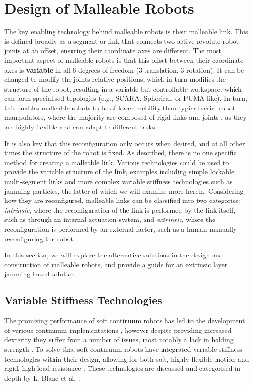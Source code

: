 
\section{Design of Malleable Robots}\label{MalleableDesign}
The key enabling technology behind malleable robots is their malleable link. This is defined broadly as a segment or link that connects two active revolute robot joints at an offset, ensuring their coordinate axes are different. The most important aspect of malleable robots is that this offset between their coordinate axes is \textbf{variable} in all 6 degrees of freedom (3 translation, 3 rotation). It can be changed to modify the joints relative positions, which in turn modifies the structure of the robot, resulting in a variable but controllable workspace, which can form specialised topologies (e.g., SCARA,  Spherical, or PUMA-like). In turn, this enables malleable robots to be of lower mobility than typical serial robot manipulators, where the majority are composed of rigid links and joints \cite{majidi2014soft}, as they are highly flexible and can adapt to different tasks.

It is also key that this reconfiguration only occurs when desired, and at all other times the structure of the robot is fixed. As described, there is no one specific method for creating a malleable link. Various technologies could be used to provide the variable structure of the link, examples including simple lockable multi-segment links \cite{aghili2009reconfigurable} and more complex variable stiffness technologies such as jamming particles, the latter of which we will examine more herein. Considering how they are reconfigured, malleable links can be classified into two categories: \textit{intrinsic}, where the reconfiguration of the link is performed by the link itself, such as through an internal actuation system, and \textit{extrinsic}, where the reconfiguration is performed by an external factor, such as a human manually reconfiguring the robot.

In this section, we will explore the alternative solutions in the design and construction of malleable robots, and provide a guide for an extrinsic layer jamming based solution.

\subsection{Variable Stiffness Technologies}
The promising performance of soft continuum robots has led to the development of various continuum implementations \cite{kang2013design, grissom2006design, mcmahan2005design}, however despite providing increased dexterity they suffer from a number of issues, most notably a lack in holding strength \cite{robertson2017soft, burgner2015continuum}. To solve this, soft continuum robots have integrated variable stiffness technologies within their design, allowing for both soft, highly flexible motion and rigid, high load resistance \cite{jiang2012design, santiago2016soft, kim2013novel, kim2012design}. These technologies are discussed and categorised in depth by L. Blanc et al. \cite{blanc2017flexible}.

